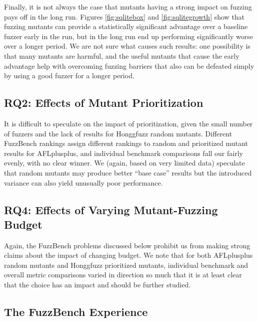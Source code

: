 Finally, it is not always the case that mutants having a strong impact on fuzzing pays off in the long run.  Figures \ref{fig:sqlitebox} and \ref{fig:sqlitegrowth} show that fuzzing mutants can provide a statistically significant advantage over a baseline fuzzer early in the run, but in the long run end up performing significantly worse over a longer period.  We are not sure what causes such results: one possibility is that many mutants are harmful, and the useful mutants that cause the early advantage help with overcoming fuzzing barriers that also can be defeated simply by using a good fuzzer for a longer period.

 \subsection{RQ2: Effects of Mutant Prioritization}

It is difficult to speculate on the impact of prioritization, given the small number of fuzzers and the lack of results for Honggfuzz random mutants.  Different FuzzBench rankings assign different rankings to random and prioritized mutant results for AFLplusplus, and individual benchmark comparisons fall our fairly evenly, with no clear winner.  We (again, based on very limited data) speculate that random mutants may produce better ``base case'' results but the introduced variance can also yield unusually poor performance.

\subsection{RQ4: Effects of Varying Mutant-Fuzzing Budget}

Again, the FuzzBench problems discussed below prohibit us from making strong claims about the impact of changing budget.  We note that for both AFLplusplus random mutants and Honggfuzz prioritized mutants, individual benchmark and overall metric comparisons varied in direction so much that it is at least clear that the choice has an impact and should be further studied.
    
\subsection{The FuzzBench Experience}
\label{sec:fuzzexp}

